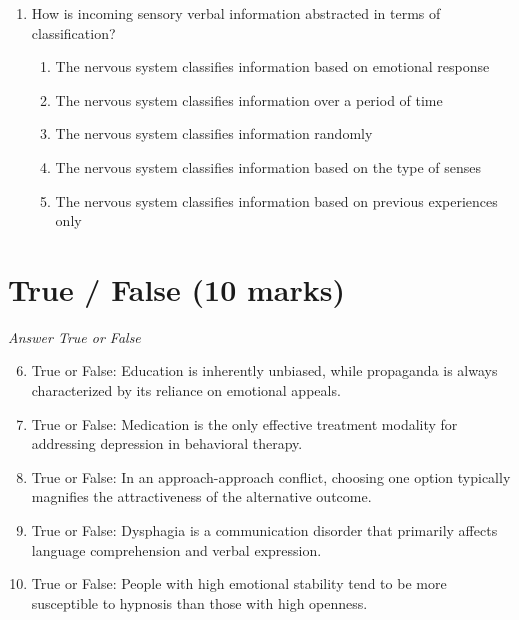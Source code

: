 \documentclass[12pt]{article}
\begin{document}
\begin{enumerate}[label=\arabic*.]
Purdue Pegboard). In general, these studies have revealed that
\begin{enumerate}[label=(\alph*)]
    \item most motor functions are determined by age and gender
    \item motor functions are independent and do not correlate
    \item motor functions correlate moderately and form 3 to 4 factors
    \item most motor functions correlate highly and form a single factor
    \item most motor functions correlate highly and form 2 single factor
\end{enumerate}
\item How is incoming sensory verbal information abstracted in terms of classification?
\begin{enumerate}[label=(\alph*)]
    \item The nervous system classifies information based on emotional response
    \item The nervous system classifies information over a period of time
    \item The nervous system classifies information randomly
    \item The nervous system classifies information based on the type of senses
    \item The nervous system classifies information based on previous experiences only
\end{enumerate}
\end{enumerate}

\section*{True / False (10 marks)}
\textit{Answer True or False}
\begin{enumerate}[label=\arabic*.]
\setcounter{enumi}{5}
\item True or False: Education is inherently unbiased, while propaganda is always characterized by its reliance on emotional appeals.
\item True or False: Medication is the only effective treatment modality for addressing depression in behavioral therapy.
\item True or False: In an approach-approach conflict, choosing one option typically magnifies the attractiveness of the alternative outcome.
\item True or False: Dysphagia is a communication disorder that primarily affects language comprehension and verbal expression.
\item True or False: People with high emotional stability tend to be more susceptible to hypnosis than those with high openness.
\end{enumerate}
\end{document}
